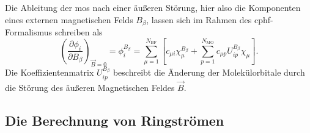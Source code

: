      
     
	 Die Ableitung der \acp{mo} nach einer äußeren Störung, hier also die Komponenten  eines externen magnetischen Felds $B_\beta$, lassen sich im Rahmen des \ac{cphf}-Formalismus schreiben als
    \begin{equation}
    \left(\frac{\partial \phi_i}{\partial B_\beta}\right)_{\vec{B}=0}=\phi_i^{B_\beta}=\sum_{\mu=1}^{N_{\text{BF}}}\left[c_{\mu i}\chi_\mu^{B_\beta}+\sum_{p=1}^{N_{\text{MO}}}c_{\mu p}U_{ip}^{B_\beta}\chi_\mu\right].
	\end{equation}
	Die Koeffizientenmatrix $U_{ip}^{B_\beta}$ beschreibt die Änderung der Molekülorbitale durch die Störung des äußeren Magnetischen Feldes $\vec{B}$. 
     
	\subsection{Die Berechnung von Ringströmen}
